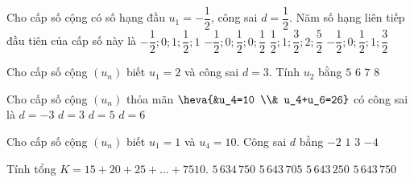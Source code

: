 \begin{ex}%
Cho cấp số cộng có số hạng đầu $u_1=-\dfrac{1}{2}$, công sai $d=\dfrac{1}{2}$. Năm số hạng liên tiếp đầu tiên của cấp số này là
\choice
{$-\dfrac{1}{2}; 0; 1; \dfrac{1}{2}; 1$}
{$-\dfrac{1}{2}; 0; \dfrac{1}{2}; 0; \dfrac{1}{2}$}
{$\dfrac{1}{2}; 1; \dfrac{3}{2}; 2; \dfrac{5}{2}$}
{\True $-\dfrac{1}{2}; 0; \dfrac{1}{2}; 1; \dfrac{3}{2}$}
\end{ex}
\begin{ex}%
Cho cấp số cộng $\left(u_n\right)$ biết $u_1=2$ và công sai $d=3$. Tính $u_2$ bằng
\choice
{\True $5$}
{$6$}
{$7$}
{$8$}
\end{ex}
\begin{ex}%
Cho cấp số cộng $\left(u_n\right)$ thỏa mãn $\heva{&u_4=10 \\& u_4+u_6=26}$ có công sai là
\choice
{$d=-3$}
{\True $d=3$}
{$d=5$}
{$d=6$}
\end{ex}
\begin{ex}%
Cho cấp số cộng $\left(u_n\right)$ biết $u_1=1$ và $u_4=10$. Công sai $d$ bằng
\choice
{$-2$}
{$1$}
{\True $3$}
{$-4$}
\end{ex}
\begin{ex}%
Tính tổng $K=15+20+25+\ldots+7510$.
\choice
{$5\,634\,750$ }
{$5\,643\,705$}
{$5\,643\,250$}
{\True $5\,643\,750$}
\end{ex}
